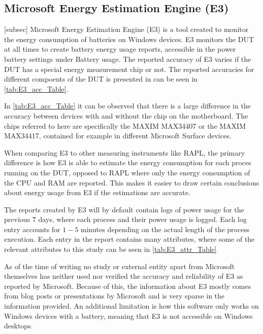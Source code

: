 \subsection{Microsoft Energy Estimation Engine (E3)}[subsec]\label{subsec:e3}
Microsoft Energy Estimation Engine (E3) is a tool created to monitor the energy consumption of batteries on Windows devices. E3 monitors the DUT at all times to create battery energy usage reports, accessible in the power battery settings under Battery usage.\cite[p.43]{E3WinHec} The reported accuracy of E3 varies if the DUT has a special energy measurement chip or not. The reported accuracies for different compoents of the DUT is presented in \cite{E3WinHec} can be seen in \cref{tab:E3_acc_Table}.



In \cref{tab:E3_acc_Table} it can be observed that there is a large difference in the accuracy between devices with and without the chip on the motherboard. The chips referred to here are specifically the MAXIM MAX34407 or the MAXIM MAX34417, contained for example in different Microsoft Surface devices.\newline


When comparing E3 to other measuring instruments like RAPL, the primary difference is how E3 is able to estimate the energy consumption for each proces running on the DUT, opposed to RAPL where only the energy consumption of the CPU and RAM are reported. This makes it easier to draw certain conclusions about energy usage from E3 if the estimations are accurate.\newline

The reports created by E3 will by default contain logs of power usage for the previous $7$ days, where each process and their power usage is logged. Each log entry accounts for $1-5$ minutes depending on the actual length of the process execution\cite[]{E3Video}. Each entry in the report contains many attributes, where some of the relevant attributes to this study can be seen in \cref{tab:E3_attr_Table}



As of the time of writing no study or external entity apart from Microsoft themselves has neither used nor verified the accuracy and reliability of E3 as reported by Microsoft. Because of this, the information about E3 mostly comes from blog posts or presentations by Microsoft and is very sparse in the information provided. An additional limitation is how this software only works on Windows devices with a battery, meaning that E3 is not accessible on Windows desktops.\newline

